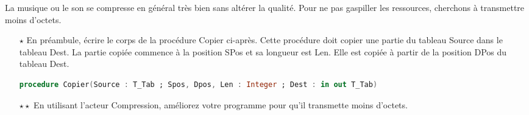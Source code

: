 

La musique ou le son se compresse en général très bien sans altérer la qualité.
Pour ne pas gaspiller les ressources, cherchons à transmettre moins d'octets.

\vfill

\begin{itemize}
\item[$\star$] En préambule, écrire le corps de la procédure Copier ci-après. Cette procédure doit copier une partie du tableau Source dans le tableau Dest.
  La partie copiée commence à la position SPos et sa longueur est Len. Elle est copiée à partir de la position DPos du tableau Dest.

  \begin{lstlisting}[language=Ada]
    procedure Copier(Source : T_Tab ; Spos, Dpos, Len : Integer ; Dest : in out T_Tab) 
  \end{lstlisting}
\vspace{-4ex}
\begin{center}
\end{center}
\vspace{-3ex}
  \item[$\star\star$] En utilisant l'acteur Compression, améliorez votre programme pour qu'il transmette moins d'octets.
\end{itemize}

